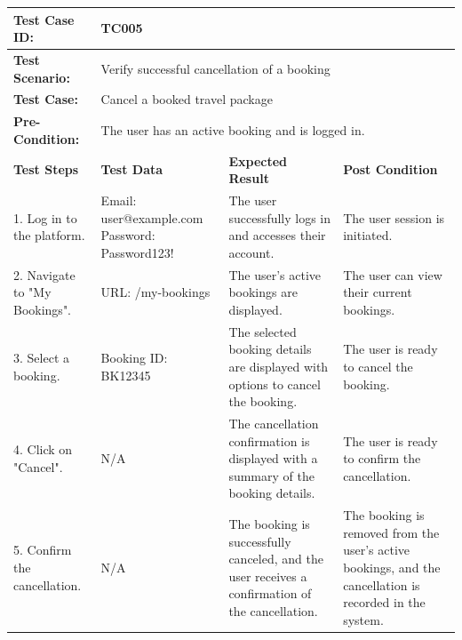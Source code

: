 \documentclass{scrreprt}
\begin{document}
\begin{longtable}{| m{2cm} | m{5cm} | m{4cm} | m{3cm} |}
\hline

\textbf{Test Case ID:} & \multicolumn{3}{l|}{TC005} \\ \hline
\textbf{Test Scenario:} & \multicolumn{3}{l|}{Verify successful cancellation of a booking} \\ \hline
\textbf{Test Case:} & \multicolumn{3}{l|}{Cancel a booked travel package} \\ \hline
\textbf{Pre-Condition:} & \multicolumn{3}{l|}{The user has an active booking and is logged in.} \\ \hline
\textbf{Test Steps} & \textbf{Test Data} & \textbf{Expected Result} & \textbf{Post Condition} \\ \hline
1. Log in to the platform. & Email: user@example.com \newline Password: Password123! & The user successfully logs in and accesses their account. & The user session is initiated. \\ \hline
2. Navigate to "My Bookings". & URL: /my-bookings & The user's active bookings are displayed. & The user can view their current bookings. \\ \hline
3. Select a booking. & Booking ID: BK12345 & The selected booking details are displayed with options to cancel the booking. & The user is ready to cancel the booking. \\ \hline
4. Click on "Cancel". & N/A & The cancellation confirmation is displayed with a summary of the booking details. & The user is ready to confirm the cancellation. \\ \hline
5. Confirm the cancellation. & N/A & The booking is successfully canceled, and the user receives a confirmation of the cancellation. & The booking is removed from the user's active bookings, and the cancellation is recorded in the system. \\ \hline
\end{longtable}

\vspace{1cm}
\end{document}

